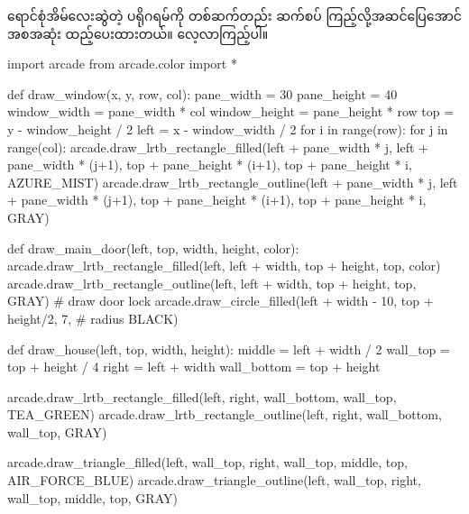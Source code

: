 ရောင်စုံအိမ်လေးဆွဲတဲ့ ပရိုဂရမ်ကို တစ်ဆက်တည်း ဆက်စပ် ကြည့်လို့အဆင်ပြေအောင် အစအဆုံး ထည့်ပေးထားတယ်။ လေ့လာကြည့်ပါ။ 
%
\begin{py}
import arcade
from arcade.color import *


def draw_window(x, y, row, col):
    pane_width = 30
    pane_height = 40
    window_width = pane_width * col
    window_height = pane_height * row
    top = y - window_height / 2
    left = x - window_width / 2
    for i in range(row):
        for j in range(col):
            arcade.draw_lrtb_rectangle_filled(left + pane_width * j,
                                              left + pane_width * (j+1),
                                              top + pane_height * (i+1),
                                              top + pane_height * i,
                                              AZURE_MIST)
            arcade.draw_lrtb_rectangle_outline(left + pane_width * j,
                                               left + pane_width * (j+1),
                                               top + pane_height * (i+1),
                                               top + pane_height * i,
                                               GRAY)


def draw_main_door(left, top, width, height, color):
    arcade.draw_lrtb_rectangle_filled(left, left + width,
                                      top + height, top,
                                      color)
    arcade.draw_lrtb_rectangle_outline(left, left + width,
                                       top + height, top,
                                       GRAY)
    # draw door lock
    arcade.draw_circle_filled(left + width - 10,
                              top + height/2,
                              7,                  # radius
                              BLACK)


def draw_house(left, top, width, height):
    middle = left + width / 2
    wall_top = top + height / 4
    right = left + width
    wall_bottom = top + height

    arcade.draw_lrtb_rectangle_filled(left, right,
                                      wall_bottom, wall_top,
                                      TEA_GREEN)
    arcade.draw_lrtb_rectangle_outline(left, right,
                                       wall_bottom, wall_top,
                                       GRAY)

    arcade.draw_triangle_filled(left, wall_top, right,
                                wall_top, middle, top,
                                AIR_FORCE_BLUE)
    arcade.draw_triangle_outline(left, wall_top,
                                 right, wall_top,
                                 middle, top,
                                 GRAY)


\end{py}
